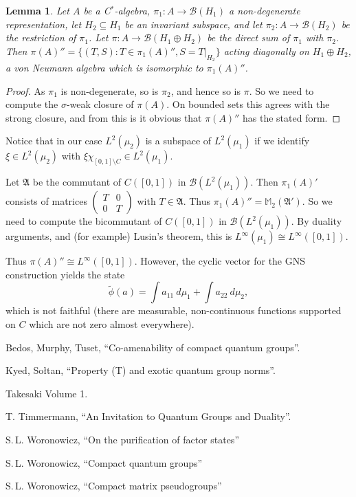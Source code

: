 \documentclass[twoside,a4paper,12pt]{article}
\theoremstyle{plain}
\newtheorem{lemma}[proposition]{Lemma}
\theoremstyle{definition}
\newcommand{\mc}{\mathcal}
\newcommand{\mf}{\mathfrak}
\begin{document}
\begin{lemma}
Let $A$ be a C$^*$-algebra, $\pi_1:A\rightarrow\mc B(H_1)$ a non-degenerate
representation, let $H_2\subseteq H_1$ be an invariant subspace, and let
$\pi_2:A\rightarrow\mc B(H_2)$ be the restriction of $\pi_1$.  Let $\pi:
A\rightarrow\mc B(H_1\oplus H_2)$ be the direct sum of $\pi_1$ with $\pi_2$.
Then $\pi(A)'' = \{ (T,S) : T\in\pi_1(A)'', S=T|_{H_2} \}$ acting diagonally
on $H_1\oplus H_2$, a von Neumann algebra which is isomorphic to $\pi_1(A)''$.
\end{lemma}
\begin{proof}
As $\pi_1$ is non-degenerate, so is $\pi_2$, and hence so is $\pi$.  So we
need to compute the $\sigma$-weak closure of $\pi(A)$.  On bounded sets this
agrees with the strong closure, and from this is it obvious that $\pi(A)''$
has the stated form.
\end{proof}

Notice that in our case $L^2(\mu_2)$ is a subspace of $L^2(\mu_1)$ if we
identify $\xi\in L^2(\mu_2)$ with $\xi\chi_{[0,1]\setminus C}\in L^2(\mu_1)$.

Let $\mf A$ be the commutant of $C([0,1])$ in $\mc B(L^2(\mu_1))$.  Then
$\pi_1(A)'$ consists of matrices $\begin{pmatrix} T & 0 \\ 0 & T \end{pmatrix}$
with $T\in\mf A$.  Thus $\pi_1(A)'' = \mathbb M_2(\mf A')$.  So we need to
compute the bicommutant of $C([0,1])$ in $\mc B(L^2(\mu_1))$.  By duality
arguments, and (for example) Lusin's theorem, this is $L^\infty(\mu_1) \cong
L^\infty([0,1])$.

Thus $\pi(A)'' \cong L^\infty([0,1])$.  However, the cyclic vector for the
GNS construction yields the state
\[ \tilde\phi(a) = \int a_11 \ d\mu_1 + \int a_22 \ d\mu_2, \]
which is not faithful (there are measurable, non-continuous functions
supported on $C$ which are not zero almost everywhere).




\begin{thebibliography}{aa}

 Bedos, Murphy, Tuset, ``Co-amenability of compact quantum groups''.

 Kyed, So{\l}tan, ``Property (T) and exotic quantum group norms''.

 Takesaki Volume 1.

 T. Timmermann, ``An Invitation to Quantum Groups and Duality''.

 S.\,L. Woronowicz, ``On the purification of factor states''

 S.\,L. Woronowicz, ``Compact quantum groups''

 S.\,L. Woronowicz, ``Compact matrix pseudogroups''

\end{thebibliography}
\end{document}
